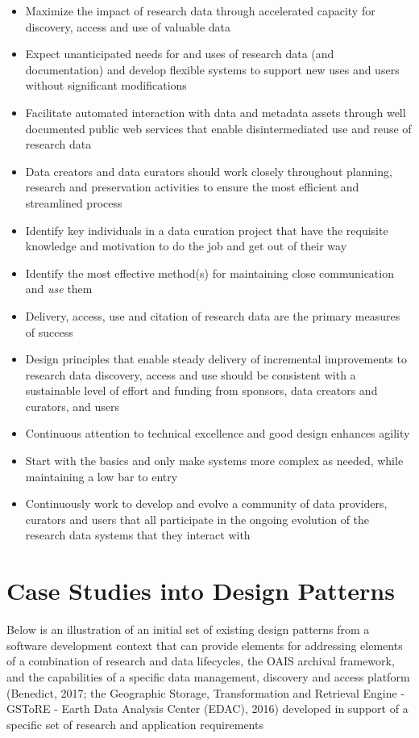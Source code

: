 \documentclass[final]{beamer}
\providecommand{\tightlist}{%
  \setlength{\itemsep}{0pt}\setlength{\parskip}{0pt}}
\begin{document}
\begin{frame}[t]
\begin{multicols}{2}
\begin{itemize}
\tightlist
\item
  Maximize the impact of research data through accelerated capacity for
  discovery, access and use of valuable data
\item
  Expect unanticipated needs for and uses of research data (and
  documentation) and develop flexible systems to support new uses and
  users without significant modifications
\item
  Facilitate automated interaction with data and metadata assets through
  well documented public web services that enable disintermediated use
  and reuse of research data
\item
  Data creators and data curators should work closely throughout
  planning, research and preservation activities to ensure the most
  efficient and streamlined process
\item
  Identify key individuals in a data curation project that have the
  requisite knowledge and motivation to do the job and get out of their
  way
\item
  Identify the most effective method(s) for maintaining close
  communication and \emph{use} them
\item
  Delivery, access, use and citation of research data are the primary
  measures of success
\item
  Design principles that enable steady delivery of incremental
  improvements to research data discovery, access and use should be
  consistent with a sustainable level of effort and funding from
  sponsors, data creators and curators, and users
\item
  Continuous attention to technical excellence and good design enhances
  agility
\item
  Start with the basics and only make systems more complex as needed,
  while maintaining a low bar to entry
\item
  Continuously work to develop and evolve a community of data providers,
  curators and users that all participate in the ongoing evolution of
  the research data systems that they interact with
\end{itemize}

\section{Case Studies into Design
Patterns}\label{case-studies-into-design-patterns}

Below is an illustration of an initial set of existing design patterns
from a software development context that can provide elements for
addressing elements of a combination of research and data lifecycles,
the OAIS archival framework, and the capabilities of a specific data
management, discovery and access platform (Benedict, 2017; the
Geographic Storage, Transformation and Retrieval Engine - GSToRE - Earth
Data Analysis Center (EDAC), 2016) developed in support of a specific
set of research and application requirements


\end{multicols}
\end{frame}
\end{document}
